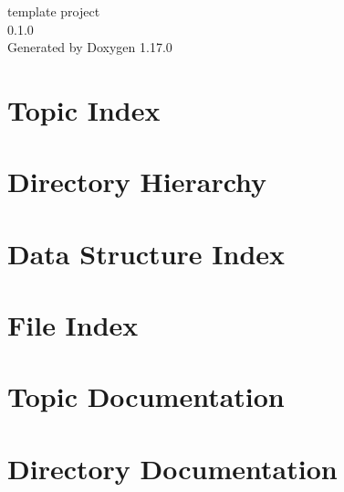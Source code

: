\documentclass[twoside]{book}
\newcommand{\+}{\discretionary{\mbox{\scriptsize$\hookleftarrow$}}{}{}}
\newcommand{\clearemptydoublepage}{%
    \newpage{\pagestyle{empty}\cleardoublepage}%
  }
\begin{document}
  \raggedbottom
    \hypersetup{pageanchor=false,
                bookmarksnumbered=true,
                pdfencoding=unicode
               }
  \begin{titlepage}
  \vspace*{7cm}
  \begin{center}%
  {\Large template project}\\
  [1ex]\large 0.\+1.\+0 \\
  \vspace*{1cm}
  {\large Generated by Doxygen 1.17.0}\\
  \end{center}
  \end{titlepage}
  \clearemptydoublepage
  \tableofcontents
  \clearemptydoublepage
  \hypersetup{pageanchor=true}

\chapter{Topic Index}

\chapter{Directory Hierarchy}

\chapter{Data Structure Index}

\chapter{File Index}

\chapter{Topic Documentation}




\chapter{Directory Documentation}













\end{document}
